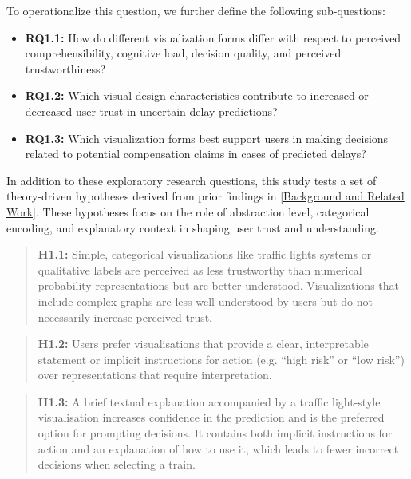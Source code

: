 \documentclass[final,journal,a4paper]{IEEEtran}
\begin{document}
To operationalize this question, we further define the following sub-questions:

\begin{itemize}
    \item \hypertarget{rq:1.1}{}\textbf{RQ1.1:} How do different visualization forms differ with respect to perceived comprehensibility, cognitive load, decision quality, and perceived trustworthiness?
    \item \hypertarget{rq:1.2}{}\textbf{RQ1.2:} Which visual design characteristics contribute to increased or decreased user trust in uncertain delay predictions?
    \item \hypertarget{rq:1.3}{}\textbf{RQ1.3:} Which visualization forms best support users in making decisions related to potential compensation claims in cases of predicted delays?
\end{itemize}

In addition to these exploratory research questions, this study tests a set of theory-driven hypotheses derived from prior findings in \ref{Background and Related Work}. These hypotheses focus on the role of abstraction level, categorical encoding, and explanatory context in shaping user trust and understanding.

\begin{quote}
\hypertarget{h:1.1}{}\textbf{H1.1:} Simple, categorical visualizations like traffic lights systems or qualitative labels are perceived as less trustworthy than numerical probability representations but are better understood. Visualizations that include complex graphs are less well understood by users but do not necessarily increase perceived trust.
\end{quote}

\begin{quote}
\hypertarget{h:1.2}{}\textbf{H1.2:} Users prefer visualisations that provide a clear, interpretable statement or implicit instructions for action (e.g. ``high risk'' or ``low risk'') over representations that require interpretation.
\end{quote}

\begin{quote}
\hypertarget{h:1.3}{}\textbf{H1.3:} A brief textual explanation accompanied by a traffic light-style visualisation increases confidence in the prediction and is the preferred option for prompting decisions. It contains both implicit instructions for action and an explanation of how to use it, which leads to fewer incorrect decisions when selecting a train.
\end{quote}
\end{document}

